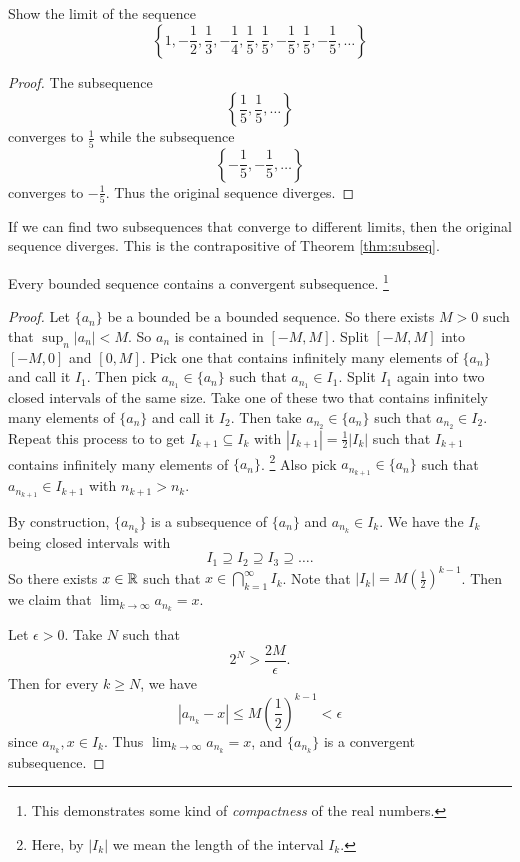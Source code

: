 \begin{exercise}
  Show the limit of the sequence
  \[
    \left\{1, -\frac{1}{2}, \frac{1}{3}, -\frac{1}{4}, \frac{1}{5}, \frac{1}{5}, -\frac{1}{5}, \frac{1}{5}, -\frac{1}{5}, \dots\right\}
  \]
\end{exercise}

\begin{proof}
  The subsequence
  \[\left\{\frac{1}{5}, \frac{1}{5}, \dots\right\}\]
  converges to $\frac{1}{5}$ while the subsequence
  \[\left\{-\frac{1}{5}, -\frac{1}{5}, \dots\right\}\]
  converges to $-\frac{1}{5}$. Thus the original
  sequence diverges.
\end{proof}

\begin{remark}
  If we can find two subsequences that converge to different
  limits, then the original sequence diverges.
  This is the contrapositive of Theorem \ref{thm:subseq}.
\end{remark}

\begin{theorem}
  Every bounded sequence contains a convergent subsequence.
  \footnote{This demonstrates some kind of
    \textit{compactness} of the real numbers.}
\end{theorem}

\begin{proof}
  Let $\{a_n\}$ be a bounded  be a bounded sequence.
  So there exists $M > 0$ such that $\sup_{n} |a_n| < M$.
  So $a_n$ is contained in $[-M, M]$. Split
  $[-M, M]$ into $[-M, 0]$ and $[0, M]$.
  Pick one that contains infinitely many elements of
  $\{a_n\}$ and call it $I_1$. Then pick
  $a_{n_1} \in \{a_n\}$ such that $a_{n_1} \in I_1$.
  Split $I_1$ again into two closed intervals of
  the same size. Take one of these two that contains
  infinitely many elements of $\{a_n\}$ and call it $I_2$.
  Then take $a_{n_2} \in \{a_n\}$ such that
  $a_{n_2} \in I_2$. Repeat this process to to get
  $I_{k+1} \subseteq I_k$ with
  $|I_{k+1}| = \frac{1}{2}|I_k|$ such that $I_{k+1}$
  contains infinitely many elements of $\{a_n\}$.
  \footnote{Here, by $|I_k|$ we mean the length of the
    interval $I_k$.}
  Also pick $a_{n_{k+1}} \in \{a_n\}$ such that
  $a_{n_{k+1}} \in I_{k+1}$ with $n_{k + 1} > n_k$.
  
  By construction, $\{a_{n_k}\}$ is a subsequence of
  $\{a_n\}$ and $a_{n_k} \in I_k$. We have the
  $I_k$ being closed intervals with
  \[
  I_1 \supseteq I_2 \supseteq I_3 \supseteq \dots
  .\]
  So there exists $x \in \mathbb{R}$ such that
  $x \in \bigcap_{k = 1}^{\infty} I_k$. Note that
  $|I_k| = M\left(\frac{1}{2}\right)^{k-1}$. Then we claim
  that $\lim_{k \to \infty} a_{n_k} = x$.

  Let $\epsilon > 0$. Take $N$ such that
  \[2^N > \frac{2M}{\epsilon}.\]
  Then for every $k \ge N$, we have
  \[
    |a_{n_k} - x| \le M \left(\frac{1}{2}\right)^{k - 1}
    < \epsilon
  \]
  since $a_{n_k}, x \in I_k$.
  Thus $\lim_{k \to \infty} a_{n_k} = x$, and
  $\{a_{n_k}\}$ is a convergent subsequence.
\end{proof}
